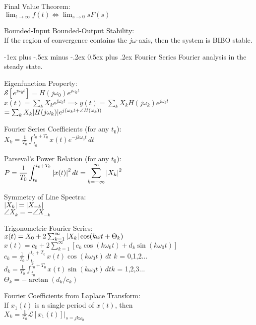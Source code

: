 \documentclass[12pt,landscape,letterpaper]{article}
\makeatletter
\renewcommand{\section}{\@startsection{section}{1}{0mm}%
                                {-1ex plus -.5ex minus -.2ex}%
                                {0.5ex plus .2ex}%
                                {\normalfont\normalsize\bfseries}}
\newcommand{\tab}{\hspace{0.02\textwidth}}
\newcommand{\ds}{\displaystyle}
\makeatother
\begin{document}
\begin{multicols*}{3}
Final Value Theorem:\\
\tab $\ds \lim_{t\rightarrow\infty} f(t) \Leftrightarrow \lim_{s\rightarrow 0} sF(s)$

Bounded-Input Bounded-Output Stability:\\
\tab If the region of convergence contains the $j\omega$-axis, then the system is BIBO stable.

\section{Fourier Series}
\tab Fourier analysis in the steady state.

Eigenfunction Property:\\
\tab $\mathcal{S}[e^{j\omega_0t}] = H(j\omega_0)e^{j\omega_0t}$\\
\tab $x(t) = \sum_k X_k e^{j\omega_kt} \implies y(t) = \sum_k X_k H(j\omega_k)e^{j\omega_kt}$\\\vspace{1mm}\hspace{2.5cm}$= \sum_k X_k \abs{H(j\omega_k)}e^{j(\omega_kt + \angle H(\omega_k))}$

Fourier Series Coefficients (for any $t_0$):\\
\tab $\ds X_k = \frac{1}{T_0}\int_{t_0}^{t_0 + T_0}x(t)e^{-jk\omega_0t}\,dt$

Parseval's Power Relation (for any $t_0$):\\
\tab $\ds P = \frac{1}{T_0} \int_{t_0}^{t_0 + T_0}\abs{x(t)}^2\,dt = \sum_{k = -\infty}^{\infty}\abs{X_k}^2$

Symmetry of Line Spectra:\\
\tab $\abs{X_k} = \abs{X_{-k}}$\\
\tab $\angle X_k = -\angle X_{-k}$

Trigonometric Fourier Series:\\
\tab $x(t) = X_0 + 2\sum_{k = 1}^{\infty}\abs{X_k}\cos(k\omega t + \Theta_k)$\\
\tab $x(t) = c_0 + 2\sum_{k = 1}^{\infty}[c_k\cos(k\omega_0 t) + d_k\sin(k\omega_0 t)]$\\
\tab $c_k = \frac{1}{T_0} \int_{t_0}^{t_0 + T_0}x(t)\cos(k\omega_0 t)\,dt$ \quad $k$ = 0,1,2$\ldots$\\
\tab $d_k = \frac{1}{T_0} \int_{t_0}^{t_0 + T_0}x(t)\sin(k\omega_0 t)\,dt$\quad $k$ = 1,2,3$\ldots$\\
\tab $\Theta_k = -\arctan(d_k/c_k)$

\columnbreak
Fourier Coefficients from Laplace Transform:\\
\tab If $x_1(t)$ is a single period of $x(t)$, then\\
\tab $X_k = \frac{1}{T_0}\mathcal{L}[x_1(t)] \big\rvert_{s = jk\omega_0}$


\end{multicols*}
\end{document}
